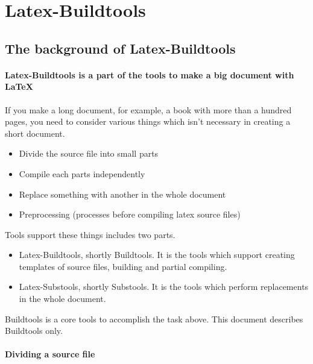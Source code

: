 \hypertarget{latex-buildtools}{%
\section{Latex-Buildtools}\label{latex-buildtools}}

\hypertarget{the-background-of-latex-buildtools}{%
\subsection{The background of
Latex-Buildtools}\label{the-background-of-latex-buildtools}}

\hypertarget{latex-buildtools-is-a-part-of-the-tools-to-make-a-big-document-with-latex}{%
\paragraph{Latex-Buildtools is a part of the tools to make a big
document with
LaTeX}\label{latex-buildtools-is-a-part-of-the-tools-to-make-a-big-document-with-latex}}

If you make a long document, for example, a book with more than a
hundred pages, you need to consider various things which isn't necessary
in creating a short document.

\begin{itemize}
\tightlist
\item
  Divide the source file into small parts
\item
  Compile each parts independently
\item
  Replace something with another in the whole document
\item
  Preprocessing (processes before compiling latex source files)
\end{itemize}

Tools support these things includes two parts.

\begin{itemize}
\tightlist
\item
  Latex-Buildtools, shortly Buildtools. It is the tools which support
  creating templates of source files, building and partial compiling.
\item
  Latex-Substools, shortly Substools. It is the tools which perform
  replacements in the whole document.
\end{itemize}

Buildtools is a core tools to accomplish the task above. This document
describes Buildtools only.

\hypertarget{dividing-a-source-file}{%
\paragraph{Dividing a source file}\label{dividing-a-source-file}}

